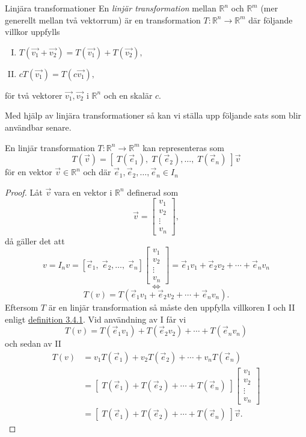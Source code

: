 \documentclass{article}
\theoremstyle{definition}
\begin{document}
\hypertarget{linjarT}{}
\begin{mydef}{Linjära transformationer}{}
  En \textit{linjär transformation} mellan $\mathbb{R}^n$ och $\mathbb{R}^m$ (mer generellt
  mellan två vektorrum) är en transformation $T: \mathbb{R}^n \rightarrow \mathbb{R}^m$
  där följande villkor uppfylls
  \begin{enumerate}[I.]
    \item $T(\vec{v_1} + \vec{v_2}) = T(\vec{v_1}) + T(\vec{v_2}),$
    \item $cT(\vec{v_1}) = T(c \vec{v_1}),$
  \end{enumerate}
  för två vektorer $\vec{v_1}, \vec{v_2}$ 
     i $\mathbb{R}^n$ och en skalär $c.$
\end{mydef}
Med hjälp av linjära transformationer så kan vi ställa upp följande sats som blir användbar senare. 

\hypertarget{linjarTsats}{}
\begin{mytheo}{}{}
  En linjär transformation $T: \mathbb{R}^n \rightarrow \mathbb{R}^m$ kan representeras 
  som 
  \[T(\vec{v}) = [ \; T(\vec{e}_1), \; T(\vec{e}_2), \ldots, \; T(\vec{e}_n) \;] \vec{v}\]
  för en vektor $\vec{v} \in \mathbb{R}^n$ och där $\vec{e}_1, \vec{e}_2, \ldots, \vec{e}_n \in I_n$
\end{mytheo}
\begin{proof}
  Låt $\vec{v}$ vara en vektor i $\mathbb{R}^n$ definerad som
  \[\vec{v} = 
  \begin{bmatrix}
    v_1 \\
    v_2 \\
    \vdots \\
    v_n
  \end{bmatrix},
  \]
  då gäller det att 
  \[
    v = I_n v = [\vec{e}_1, \; \vec{e}_2, \ldots, \; \vec{e}_n] 
    \begin{bmatrix}
      v_1 \\
      v_2 \\
      \vdots \\
      v_n
    \end{bmatrix} = \vec{e}_1 v_1 + \vec{e}_2 v_2 + \cdots + \vec{e}_n v_n 
  \]
  \[\iff\]
  \[
    T(v) = T(\vec{e}_1 v_1 + \vec{e}_2 v_2 + \cdots + \vec{e}_n v_n).
  \]
    Eftersom $T$ är en linjär transformation så måste den uppfylla villkoren I och II enligt
  \hyperlink{linjarT}{definition 3.4.1}. Vid användning av I får vi 
  \[T(v) = T(\vec{e}_1 v_1) + T(\vec{e}_2 v_2) + \cdots + T(\vec{e}_n v_n)\]
  och sedan av II
  \begin{align*}
    T(v) &= v_1 T(\vec{e}_1) + v_2 T(\vec{e}_2) + \cdots + v_n T(\vec{e}_n) \\
    &= [ \; T(\vec{e}_1) +  T(\vec{e}_2) + \cdots +  T(\vec{e}_n) \;]
    \begin{bmatrix}
      v_1 \\
      v_2 \\
      \vdots \\
      v_n
    \end{bmatrix} \\
    &=  [ \; T(\vec{e}_1) +  T(\vec{e}_2) + \cdots +  T(\vec{e}_n) \;] \vec{v}.
  \end{align*}
\end{proof}
\end{document}
